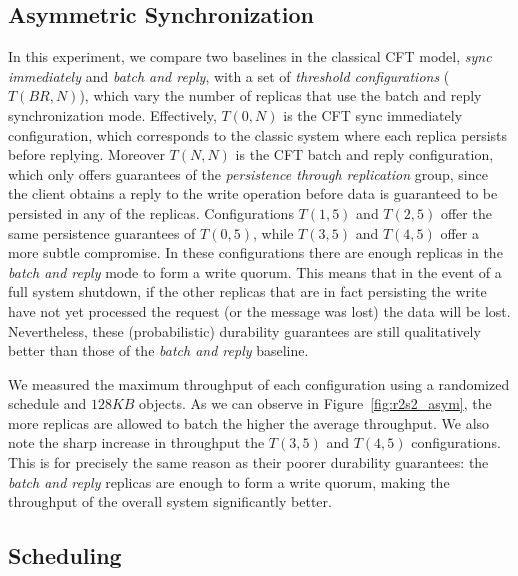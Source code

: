 \subsection{Asymmetric
Synchronization}\label{ssec:r2s2_eval_asym}

In this experiment, we compare two baselines in the classical
\ac{CFT} model, \emph{sync immediately} and \emph{batch and reply}, with a set of \emph{threshold
configurations} ($T(BR, N)$), which vary the number of replicas that use the
batch and reply synchronization mode. Effectively, $T(0, N)$ is
the \ac{CFT} sync immediately configuration, which corresponds to
the classic system where each replica persists before replying.
Moreover $T(N, N)$ is the \ac{CFT} batch and reply configuration,
which only offers guarantees of the \emph{persistence through
replication} group, since the client obtains a reply to the write
operation before data is guaranteed to be persisted in any of the
replicas. Configurations $T(1, 5)$ and $T(2, 5)$ offer the same
persistence guarantees of $T(0, 5)$, while $T(3, 5)$ and $T(4,
5)$ offer a more subtle compromise. In these configurations there are enough replicas in the \emph{batch and reply} mode
to form a write quorum. This means that in the
event of a full system shutdown, if the other replicas that are in
fact persisting the write have not yet processed the request (or
the message was lost) the data will be lost. Nevertheless, these
(probabilistic) durability guarantees are still qualitatively
better than those of the \emph{batch and reply} baseline.

We measured the maximum throughput of each configuration using a
randomized schedule and $128KB$ objects. As we can observe in
Figure~\ref{fig:r2s2_asym}, the more replicas are
allowed to batch the higher the average throughput. We also note
the sharp increase in throughput the $T(3, 5)$ and $T(4, 5)$
configurations. This is for precisely the same reason as their
poorer durability guarantees: the \emph{batch and reply} replicas
are enough to form a write quorum, making the throughput of the
overall system significantly better.


\subsection{Scheduling}\label{ssec:r2s2_eval_scheduling}



